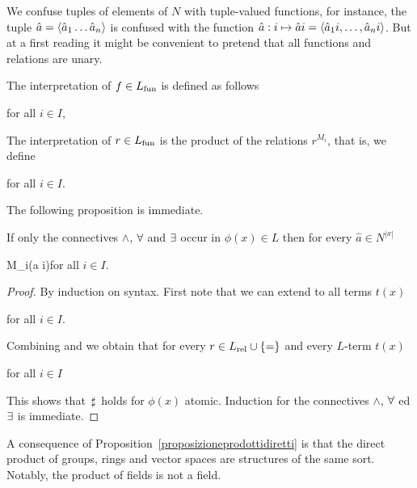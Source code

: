 \documentclass[creche.tex]{subfiles}
\begin{document}

We confuse tuples of elements of $N$ with tuple-valued functions, for instance, the tuple $\hat a=\langle\hat a_1\dots\hat a_n\rangle$ is confused with the function $\hat a:i\mapsto\hat ai=\langle\hat a_1i,\dots,\hat a_ni\rangle$. But at a first reading it might be convenient to pretend that all functions and relations are unary.

The interpretation of $f\in L_{\rm fun}$ is defined as follows

\hfill  for all $i\in I$,

The interpretation of $r\in L_{\rm fun}$ is the product of the relations $r^{M_i}$, that is, we define

\hfill  for all $i\in I$.


The following proposition is immediate.

\begin{proposition}\label{proposizioneprodottidiretti}
If only the connectives $\wedge$, $\forall$ and $\exists$ occur in $\phi(x)\in L$ then for every $\hat a\in N^{|x|}$

{\IFF}
{M_i\models\phi(\hat a i)}\hfill for all $i\in I$.

\end{proposition}

\begin{proof}
By induction on syntax. First note that we can extend  to all terms $t(x)$

\hfill  for all $i\in I$. 

Combining  and  we obtain that for every $r\in L_{\rm rel}\cup\{=\}$ and every $L$-term $t(x)$

\hfill  for all $i\in I$

This shows that $\,\sharp\,$ holds for $\phi(x)$ atomic. Induction for the connectives $\wedge$, $\forall$ ed $\exists$ is immediate.
\end{proof}

A consequence of Proposition~\ref{proposizioneprodottidiretti} is that the direct product of groups, rings and vector spaces are structures of the same sort. Notably, the product of fields is not a field.
\end{document}

